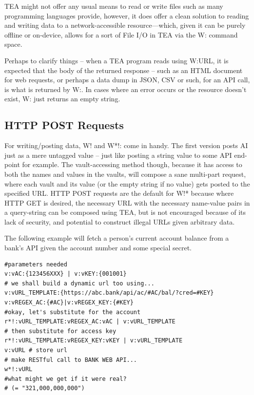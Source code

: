 \documentclass[a4paper, 18pt]{book} %
\begin{document}
{{{TEA might not offer any usual means to read or write files such as many programming languages provide, however, it does offer a clean solution to reading and writing data to a network-accessible resource---which, given it can be purely offline or on-device, allows for a sort of File I/O in TEA via the W: command space.

\vspace{2em}

Perhaps to clarify things – when a TEA program reads using W:URL, it is expected that the body of the returned response – such as an HTML document for web requests, or perhaps a data dump in JSON, CSV or such, for an API call, is what is returned by W:. In cases where an error occurs or the resource doesn’t exist, W: just returns an empty string. 


\subsection{HTTP POST Requests}


For writing/posting data, W! and W*!: come in handy. The first version posts AI just as a mere untagged value – just like posting a string value to some API end-point for example. The vault-accessing method though, because it has access to both the names and values in the vaults, will compose a sane multi-part request, where each vault and its value (or the empty string if no value) gets posted to the specified URL. HTTP POST requests are the default for W!* because where HTTP GET is desired, the necessary URL with the necessary name-value pairs in a query-string can be composed using TEA, but is not encouraged because of its lack of security, and potential to construct illegal URLs given arbitrary data.

\vspace{2em}


The following example will fetch a person’s current account balance from a bank’s API given the account number and some special secret.  


\vspace{2em}

  \begin{tcolorbox}[teaterminalstyle, title=W: EXAMPLE 1: A Simple HTTP POST - hypothetical - using dynamic URL, breakable]
  \begin{lstlisting}[language=TEA,breaklines=true,]
#parameters needed
v:vAC:{123456XXX} | v:vKEY:{001001} 
# we shall build a dynamic url too using...
v:vURL_TEMPLATE:{https://abc.bank/api/ac/#AC/bal/?cred=#KEY}
v:vREGEX_AC:{#AC}|v:vREGEX_KEY:{#KEY}
#okay, let's substitute for the account
r*!:vURL_TEMPLATE:vREGEX_AC:vAC | v:vURL_TEMPLATE 
# then substitute for access key
r*!:vURL_TEMPLATE:vREGEX_KEY:vKEY | v:vURL_TEMPLATE 
v:vURL # store url
# make RESTful call to BANK WEB API...
w*!:vURL 
#what might we get if it were real?
# (= "321,000,000,000")
   \end{lstlisting}
  \end{tcolorbox}

}}}
\end{document}
